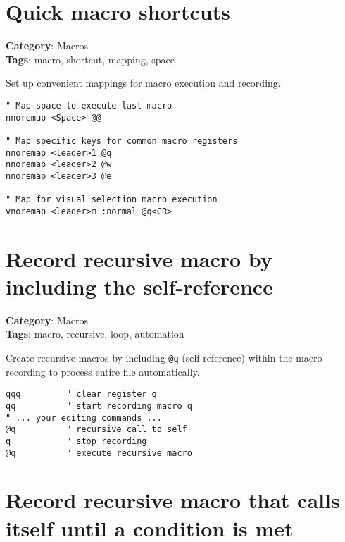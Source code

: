 {{{{{{\section{Quick macro shortcuts}

\textbf{Category}: Macros\\ \textbf{Tags}: macro, shortcut, mapping, space
\vspace{0.5cm}

Set up convenient mappings for macro execution and recording.

\begin{Exa*}{}
\begin{Verbatim}[fontsize=\footnotesize, breaklines, breakanywhere]
" Map space to execute last macro
nnoremap <Space> @@

" Map specific keys for common macro registers
nnoremap <leader>1 @q
nnoremap <leader>2 @w
nnoremap <leader>3 @e

" Map for visual selection macro execution
vnoremap <leader>m :normal @q<CR>
\end{Verbatim}
\end{Exa*}

\section{Record recursive macro by including the self-reference}

\textbf{Category}: Macros\\ \textbf{Tags}: macro, recursive, loop, automation
\vspace{0.5cm}

Create recursive macros by including {\footnotesize \Verb§@q§} (self-reference) within the macro recording to process entire file automatically.

\begin{Exa*}{}
\begin{Verbatim}[fontsize=\footnotesize, breaklines, breakanywhere]
qqq         " clear register q
qq          " start recording macro q
" ... your editing commands ...
@q          " recursive call to self
q           " stop recording
@q          " execute recursive macro
\end{Verbatim}
\end{Exa*}

\section{Record recursive macro that calls itself until a condition is met}

}}}}}}
